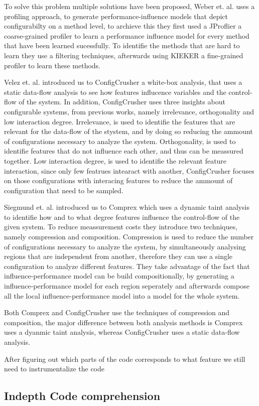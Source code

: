 To solve this problem multiple solutions have been proposed, Weber et. al. \cite{White-box-Profiling} uses a profiling approach, to generate 
performance-influence models that depict configurabilty on a method level, to archieve this they first used a JProflier a coarse-grained profiler
to learn a performance influence model for every method that have been learned sucessfully. 
To identifie the methods that are hard to learn they use a filtering techniques, afterwards using KIEKER a fine-grained profiler to learn these methods.

Velez et. al. introduced us to ConfigCrusher \cite{ConfigCrusher} a white-box analysis, that uses a static data-flow analysis to see how features influcence 
variables and the control-flow of the system. In addition, ConfigCrusher uses three insights about configurable systems, from previous works, namely
irrelevance, orthogonality and low interaction degree. Irrelevance, is used to identifie the features that are relevant for the data-flow of the stystem, and by
doing so reducing the ammount of configurations necessary to analyze the system. Orthogonality, is used to identifie features that do not influence each other, and
thus can be meassured together. Low interaction degree, is used to identifie the relevant feature interaction, since only few featrues intearact with another, 
ConfigCrusher focuses on those configurations with interacing features to reduce the ammount of configuration that need to be sampled.

Siegmund et. al. introduced us to Comprex \cite{Comprex} which uses a dynamic taint analysis to identifie how
and to what degree features influence the control-flow of the given system. 
To reduce meassurement costs they introduce two techniques, namely compression and composition. 
Compression is used to reduce the number of configurations necessary to analyze the system,
by simultaneously analysing regions that are independent from another, therefore they can use a single configuration to 
analyze different features. 
They take advantage of the fact that influence-performance model can be build compositionally, by generating a influence-performance model for each region seperately
and afterwards compose all the local influence-performance model into a model for the whole system.

Both Comprex and ConfigCrusher use the techniques of compression and composition, the major difference between both analysis methods is Comprex uses a dyanmic taint
analysis, whereas ConfigCrusher uses a static data-flow analysis. 


After figuring out which parts of the code corresponds to what feature we still need to instrumentalize the code 

\subsection{Indepth Code comprehension} %